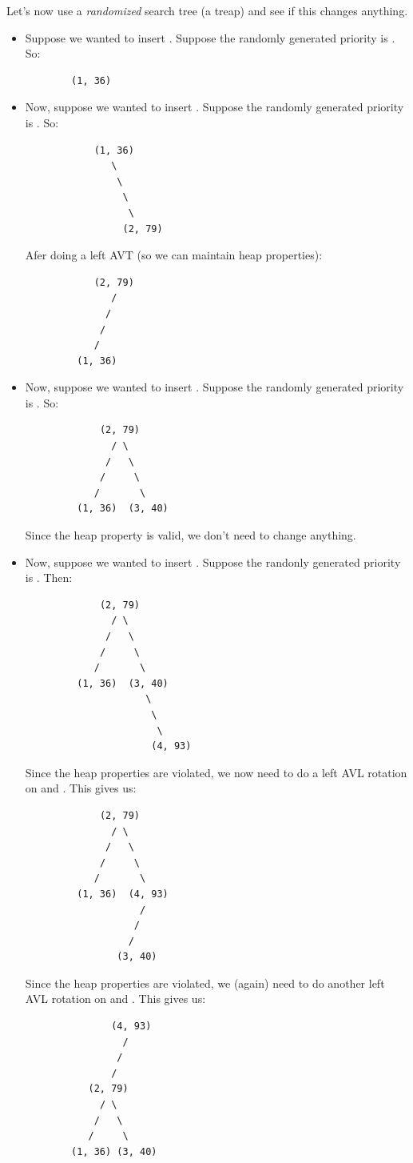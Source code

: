 \documentclass[letterpaper]{article}
\begin{document}
Let's now use a \emph{randomized} search tree (a treap) and see if this changes anything. 
\begin{itemize}
    \item Suppose we wanted to insert . Suppose the randomly generated priority is . So: 
    \begin{verbatim}
        (1, 36)
    \end{verbatim}

    \item Now, suppose we wanted to insert . Suppose the randomly generated priority is . So: 
    \begin{verbatim}
            (1, 36)
               \
                \ 
                 \ 
                  \ 
                 (2, 79)
    \end{verbatim}
    Afer doing a left AVT (so we can maintain heap properties): 
    \begin{verbatim}
            (2, 79)
               /
              /
             /
            /
         (1, 36)  
    \end{verbatim}

    \item Now, suppose we wanted to insert . Suppose the randomly generated priority is . So: 
    \begin{verbatim}
             (2, 79)
               / \ 
              /   \ 
             /     \ 
            /       \ 
         (1, 36)  (3, 40)
    \end{verbatim}
    Since the heap property is valid, we don't need to change anything. 

    \item Now, suppose we wanted to insert . Suppose the randonly generated priority is . Then: 
        \begin{verbatim}
             (2, 79)
               / \ 
              /   \ 
             /     \ 
            /       \ 
         (1, 36)  (3, 40)
                     \ 
                      \ 
                       \ 
                      (4, 93)
    \end{verbatim}
    Since the heap properties are violated, we now need to do a left AVL rotation on  and . This gives us: 
    \begin{verbatim}
             (2, 79)
               / \ 
              /   \ 
             /     \ 
            /       \ 
         (1, 36)  (4, 93)
                    /
                   /
                  /
                (3, 40)    
    \end{verbatim}
    Since the heap properties are violated, we (again) need to do another left AVL rotation on  and . This gives us: 
    \begin{verbatim}
               (4, 93)
                 /
                /
               /
           (2, 79)
             / \ 
            /   \ 
           /     \ 
        (1, 36) (3, 40)   
    \end{verbatim}


\end{itemize}
\end{document}
